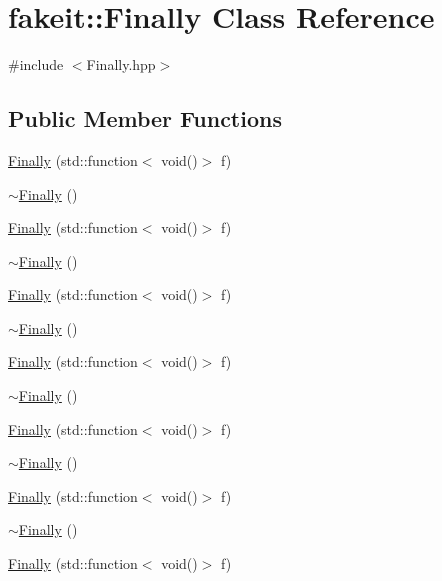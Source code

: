 \hypertarget{classfakeit_1_1Finally}{}\section{fakeit\+::Finally Class Reference}
\label{classfakeit_1_1Finally}


{\ttfamily \#include $<$Finally.\+hpp$>$}

\subsection*{Public Member Functions}
\begin{DoxyCompactItemize}
\item 
\mbox{\hyperlink{classfakeit_1_1Finally_a7e9409bbdae549c8c36bf07d4161884c}{Finally}} (std\+::function$<$ void()$>$ f)
\item 
\mbox{\hyperlink{classfakeit_1_1Finally_ac8854be9f73fc8d52334f0e71d6da413}{$\sim$\+Finally}} ()
\item 
\mbox{\hyperlink{classfakeit_1_1Finally_a7e9409bbdae549c8c36bf07d4161884c}{Finally}} (std\+::function$<$ void()$>$ f)
\item 
\mbox{\hyperlink{classfakeit_1_1Finally_ac8854be9f73fc8d52334f0e71d6da413}{$\sim$\+Finally}} ()
\item 
\mbox{\hyperlink{classfakeit_1_1Finally_a7e9409bbdae549c8c36bf07d4161884c}{Finally}} (std\+::function$<$ void()$>$ f)
\item 
\mbox{\hyperlink{classfakeit_1_1Finally_ac8854be9f73fc8d52334f0e71d6da413}{$\sim$\+Finally}} ()
\item 
\mbox{\hyperlink{classfakeit_1_1Finally_a7e9409bbdae549c8c36bf07d4161884c}{Finally}} (std\+::function$<$ void()$>$ f)
\item 
\mbox{\hyperlink{classfakeit_1_1Finally_ac8854be9f73fc8d52334f0e71d6da413}{$\sim$\+Finally}} ()
\item 
\mbox{\hyperlink{classfakeit_1_1Finally_a7e9409bbdae549c8c36bf07d4161884c}{Finally}} (std\+::function$<$ void()$>$ f)
\item 
\mbox{\hyperlink{classfakeit_1_1Finally_ac8854be9f73fc8d52334f0e71d6da413}{$\sim$\+Finally}} ()
\item 
\mbox{\hyperlink{classfakeit_1_1Finally_a7e9409bbdae549c8c36bf07d4161884c}{Finally}} (std\+::function$<$ void()$>$ f)
\item 
\mbox{\hyperlink{classfakeit_1_1Finally_ac8854be9f73fc8d52334f0e71d6da413}{$\sim$\+Finally}} ()
\item 
\mbox{\hyperlink{classfakeit_1_1Finally_a7e9409bbdae549c8c36bf07d4161884c}{Finally}} (std\+::function$<$ void()$>$ f)

\end{DoxyCompactItemize}

